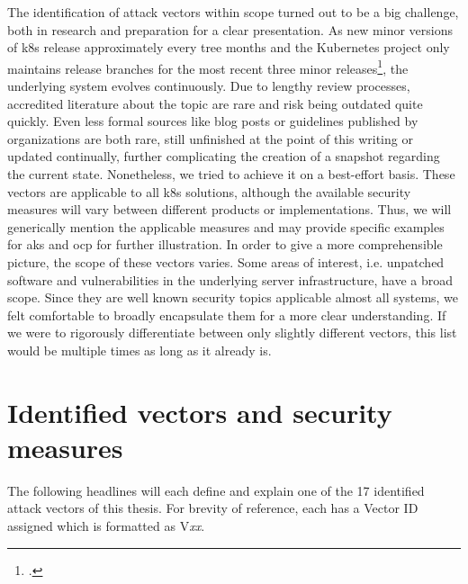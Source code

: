 The identification of attack vectors within scope turned out to be a big challenge, both in research and preparation for a clear presentation. 
As new minor versions of \gls{k8s} release approximately every tree months and the Kubernetes project only maintains release branches for the most recent three minor releases\footcite[][, section 'Supported versions']{k8sSupport}, the underlying system evolves continuously. Due to lengthy review processes, accredited literature about the topic are rare and risk being outdated quite quickly. Even less formal sources like blog posts or guidelines published by organizations are both rare, still unfinished at the point of this writing or updated continually, further complicating the creation of a snapshot regarding the current state. Nonetheless, we tried to achieve it on a best-effort basis.
These vectors are applicable to all \gls{k8s} solutions, although the available security measures will vary between different products or implementations. Thus, we will generically mention the applicable measures and may provide specific examples for \gls{aks} and \gls{ocp} for further illustration.
In order to give a more comprehensible picture, the scope of these vectors varies. Some areas of interest, i.e. unpatched software and vulnerabilities in the underlying server  infrastructure, have a broad scope. Since they are well known security topics applicable almost all systems, we felt comfortable to broadly encapsulate them for a more clear understanding. If we were to rigorously differentiate between only slightly different vectors, this list would be multiple times as long as it already is.

\section{Identified vectors and security measures}
The following headlines will each define and explain one of the 17 identified attack vectors of this thesis. For brevity of reference, each has a Vector ID assigned which is formatted as V\textit{xx}.

	


